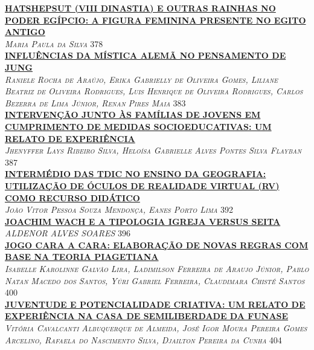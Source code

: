 \noindent \textsc{\hyperlink{trabalhos/245691.pdf.1}{\textbf{HATSHEPSUT (VIII DINASTIA) E OUTRAS RAINHAS NO PODER EGÍPCIO: A FIGURA FEMININA PRESENTE NO EGITO ANTIGO}}}\\ 
\noindent \textsc{\textit{Maria Paula da Silva}} \hfill 378\\ 

\noindent \textsc{\hyperlink{trabalhos/251406.pdf.1}{\textbf{INFLUÊNCIAS DA MÍSTICA ALEMÃ NO PENSAMENTO DE JUNG}}}\\ 
\noindent \textsc{\textit{Raniele Rocha de Araújo, Erika Gabrielly de Oliveira Gomes, Liliane Beatriz de Oliveira Rodrigues, Luis Henrique de Oliveira Rodrigues, Carlos Bezerra de Lima Júnior, Renan Pires Maia}} \hfill 383\\ 

\noindent \textsc{\hyperlink{trabalhos/251524.pdf.1}{\textbf{INTERVENÇÃO JUNTO ÀS FAMÍLIAS DE JOVENS EM CUMPRIMENTO DE MEDIDAS SOCIOEDUCATIVAS: UM RELATO DE EXPERIÊNCIA}}}\\ 
\noindent \textsc{\textit{Jhenyffer Lays Ribeiro Silva, Heloísa Gabrielle Alves Pontes Silva Flayban}} \hfill 387\\ 

\noindent \textsc{\hyperlink{trabalhos/250307.pdf.1}{\textbf{INTERMÉDIO DAS TDIC NO ENSINO DA GEOGRAFIA: UTILIZAÇÃO DE ÓCULOS DE REALIDADE VIRTUAL (RV) COMO RECURSO DIDÁTICO }}}\\ 
\noindent \textsc{\textit{João Vitor Pessoa Souza Mendonça, Eanes Porto Lima}} \hfill 392\\ 

\noindent \textsc{\hyperlink{trabalhos/249505.pdf.1}{\textbf{JOACHIM WACH E A TIPOLOGIA IGREJA VERSUS SEITA }}}\\ 
\noindent \textsc{\textit{ALDENOR ALVES SOARES}} \hfill 396\\ 

\noindent \textsc{\hyperlink{trabalhos/250487.pdf.1}{\textbf{JOGO CARA A CARA: ELABORAÇÃO DE NOVAS REGRAS COM BASE NA TEORIA PIAGETIANA}}}\\ 
\noindent \textsc{\textit{Isabelle Karolinne Galvão Lira, Ladimilson Ferreira de Araujo Júnior, Pablo Natan Macedo dos Santos, Yúri Gabriel Ferreira, Claudimara Chisté Santos}} \hfill 400\\ 

\noindent \textsc{\hyperlink{trabalhos/251721.pdf.1}{\textbf{JUVENTUDE E POTENCIALIDADE CRIATIVA: UM RELATO DE EXPERIÊNCIA NA CASA DE SEMILIBERDADE DA FUNASE}}}\\ 
\noindent \textsc{\textit{Vitória Cavalcanti Albuquerque de Almeida, José Igor Moura Pereira Gomes Arcelino, Rafaela do Nascimento Silva, Djailton Pereira da Cunha}} \hfill 404\\ 

